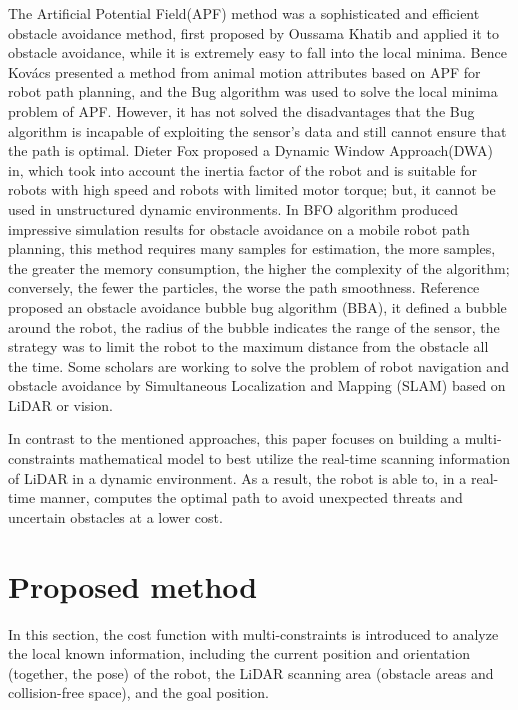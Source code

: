\documentclass{iosart2c}
\begin{document}
The Artificial Potential Field(APF) method was a sophisticated and efficient obstacle avoidance method, first proposed by Oussama Khatib\cite{14} and applied it to obstacle avoidance\cite{11,15,16}, while it is extremely easy to fall into the local minima. Bence Kovács\cite{17} presented a method from animal motion attributes based on APF for robot path planning, and the Bug algorithm was used to solve the local minima problem of APF. However, it has not solved the disadvantages that the Bug algorithm is incapable of exploiting the sensor’s data and still cannot ensure that the path is optimal. Dieter Fox proposed a Dynamic Window Approach(DWA) in\cite{18,19}, which took into account the inertia factor of the robot and is suitable for robots with high speed and robots with limited motor torque; but, it cannot be used in unstructured dynamic environments. In\cite{11} BFO algorithm produced impressive simulation results for obstacle avoidance on a mobile robot path planning, this method requires many samples for estimation, the more samples, the greater the memory consumption, the higher the complexity of the algorithm\cite{20}; conversely, the fewer the particles, the worse the path smoothness. Reference\cite{21} proposed an obstacle avoidance bubble bug algorithm (BBA), it defined a bubble around the robot, the radius of the bubble indicates the range of the sensor, the strategy was to limit the robot to the maximum distance from the obstacle all the time. Some scholars are working to solve the problem of robot navigation and obstacle avoidance by Simultaneous Localization and Mapping (SLAM)\cite{22,23} based on LiDAR or vision\cite{24,25,26,27}. 

In contrast to the mentioned approaches, this paper focuses on building a multi-constraints mathematical model to best utilize the real-time scanning information of LiDAR in a dynamic environment. As a result, the robot is able to, in a real-time manner, computes the optimal path to avoid unexpected threats and uncertain obstacles at a lower cost.


\section{Proposed method}\label{s3}
In this section, the cost function with multi-constraints is introduced to analyze the local known information, including the current position and orientation (together, the pose) of the robot, the LiDAR scanning area (obstacle areas and collision-free space), and the goal position.
\end{document}
